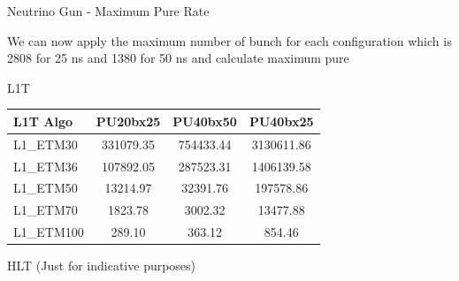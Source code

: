 \documentclass[8pt]{beamer}
\begin{document}
\begin{frame}{Neutrino Gun - Maximum Pure Rate}

We can now apply the maximum number of bunch for each configuration which is 2808 for 25 ns and 1380 for 50 ns and calculate maximum pure 

\begin{block}{L1T}
\centering

\begin{tabular}{|l|c|c|c|}
\hline
L1T Algo   &   PU20bx25 &   PU40bx50 &   PU40bx25 \\
\hline \hline
L1\_ETM30  &  331079.35 &  754433.44 & 3130611.86 \\                                                                                                                                                                                                                                                        
L1\_ETM36  &  107892.05 &  287523.31 & 1406139.58 \\                                                                                                                                                                                                                                                       
L1\_ETM50  &   13214.97 &   32391.76 &  197578.86 \\                                                                                                                                                                                                                                                      
L1\_ETM70  &    1823.78 &    3002.32 &   13477.88 \\
L1\_ETM100 &     289.10 &     363.12 &     854.46 \\                                                                                                                                                                                                                   
\hline
\end{tabular}

\end{block}

\begin{block}{HLT (Just for indicative purposes)}
 

\end{block}
\end{frame}
\end{document}
